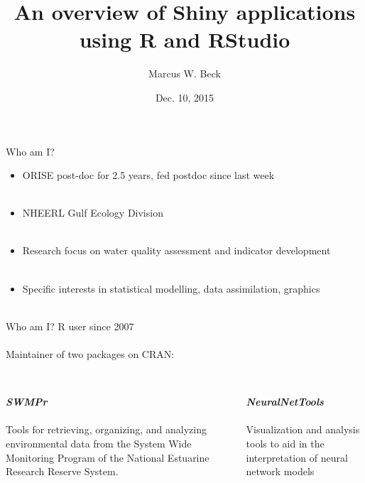 \documentclass[serif]{beamer}\usepackage[]{graphicx}\usepackage[]{color}
\newcommand{\emtxt}[1]{\textbf{\textit{#1}}}
\begin{document}
\title[Shiny Overview]{\textbf{An overview of Shiny applications using R and RStudio}\vspace{-0.15in}}
\author[M. Beck]{Marcus W. Beck}


\date{Dec. 10, 2015}

\begin{frame}
\titlepage
\end{frame}

\begin{frame}{Who am I?}
\begin{itemize}
\item ORISE post-doc for 2.5 years, fed postdoc since last week \\~\\
\item NHEERL Gulf Ecology Division \\~\\
\item Research focus on water quality assessment and indicator development \\~\\
\item Specific interests in statistical modelling, data assimilation, graphics  \\~\\
\end{itemize}
\end{frame}

\begin{frame}{Who am I?}
R user since 2007 \\~\\
Maintainer of two packages on CRAN: \\~\\
\begin{columns}[T]
\begin{column}{0.45\textwidth}
\emtxt{SWMPr}\\~\\
Tools for retrieving, organizing, and analyzing environmental data from the System Wide Monitoring Program of the National Estuarine Research Reserve System. 
\end{column}
\begin{column}{0.45\textwidth}
\emtxt{NeuralNetTools} \\~\\
Visualization and analysis tools to aid in the interpretation of neural network models
\end{column}
\end{columns}
\end{frame}
\end{document}
